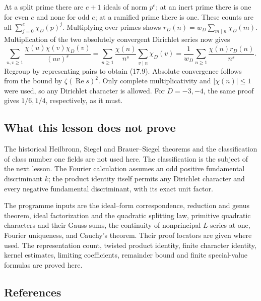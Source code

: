 \documentclass[
  11pt,
  a4paper,
]{article}
\newcounter{none} %
\begin{document}
At a split prime there are \(e+1\) ideals of norm \(p^e\); at an inert
prime there is one for even \(e\) and none for odd \(e\); at a ramified
prime there is one. These counts are all \(\sum_{j=0}^{e}\chi_D(p)^j\).
Multiplying over primes shows \(r_D(n)=w_D\sum_{m\mid n}\chi_D(m)\).
Multiplication of the two absolutely convergent Dirichlet series now
gives \[
 \sum_{u,v\ge1}\frac{\chi(u)\chi(v)\chi_D(v)}{(uv)^s}
 =\sum_{n\ge1}\frac{\chi(n)}{n^s}
                         \sum_{v\mid n}\chi_D(v)
 =\frac1{w_D}\sum_{n\ge1}\frac{\chi(n)r_D(n)}{n^s}.
\] Regroup by representing pairs to obtain (17.9). Absolute convergence
follows from the bound by \(\zeta(\operatorname{Re}s)^2\). Only complete
multiplicativity and \(|\chi(n)|\le1\) were used, so any Dirichlet
character is allowed. For \(D=-3,-4\), the same proof gives \(1/6,1/4\),
respectively, as it must.

\subsection{What this lesson does not
prove}\label{what-this-lesson-does-not-prove}

The historical Heilbronn, Siegel and Brauer--Siegel theorems and the
classification of class number one fields are not used here. The
classification is the subject of the next lesson. The Fourier
calculation assumes an odd positive fundamental discriminant \(k\); the
product identity itself permits any Dirichlet character and every
negative fundamental discriminant, with its exact unit factor.

The programme inputs are the ideal--form correspondence, reduction and
genus theorem, ideal factorization and the quadratic splitting law,
primitive quadratic characters and their Gauss sums, the continuity of
nonprincipal \(L\)-series at one, Fourier uniqueness, and Cauchy's
theorem. Their proof locators are given where used. The representation
count, twisted product identity, finite character identity, kernel
estimates, limiting coefficients, remainder bound and finite
special-value formulas are proved here.

\subsection{References}\label{references}
\end{document}
